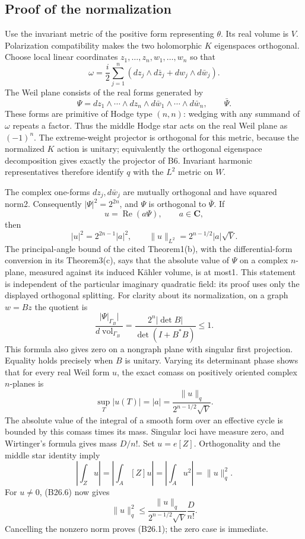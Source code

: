 \subsection{Proof of the normalization}\label{proof-of-the-normalization}

Use the invariant metric of the positive form representing \(\theta\). Its real volume is \(V\). Polarization compatibility makes the two holomorphic \(K\) eigenspaces orthogonal. Choose local linear coordinates \(z_1,\ldots,z_n,w_1,\ldots,w_n\) so that \[
 \omega=\frac i2\sum_{j=1}^n
 (dz_j\wedge d\bar z_j+dw_j\wedge d\bar w_j).
\] The Weil plane consists of the real forms generated by \[
 \Psi=dz_1\wedge\cdots\wedge dz_n
       \wedge d\bar w_1\wedge\cdots\wedge d\bar w_n,
 \qquad \bar\Psi.
\] These forms are primitive of Hodge type \((n,n)\): wedging with any summand of \(\omega\) repeats a factor. Thus the middle Hodge star acts on the real Weil plane as \((-1)^n\). The extreme-weight projector is orthogonal for this metric, because the normalized \(K\) action is unitary; equivalently the orthogonal eigenspace decomposition gives exactly the projector of B6. Invariant harmonic representatives therefore identify \(q\) with the \(L^2\) metric on \(W\).

The complex one-forms \(dz_j,d\bar w_j\) are mutually orthogonal and have squared norm2. Consequently \(|\Psi|^2=2^{2n}\), and \(\Psi\) is orthogonal to \(\bar\Psi\). If \[
 u=\operatorname{Re}(a\Psi),\qquad a\in\mathbf C,
\] then \[
 |u|^2=2^{2n-1}|a|^2,
 \qquad \|u\|_{L^2}=2^{n-1/2}|a|\sqrt V.
 \tag{B26.4}
\] The principal-angle bound of the cited Theorem1(b), with the differential-form conversion in its Theorem3(c), says that the absolute value of \(\Psi\) on a complex \(n\)-plane, measured against its induced Kähler volume, is at most1. This statement is independent of the particular imaginary quadratic field: its proof uses only the displayed orthogonal splitting. For clarity about its normalization, on a graph \(w=Bz\) the quotient is \[
 \frac{|\Psi|_{\Gamma_B}|}{d\operatorname{vol}_{\Gamma_B}}
 =\frac{2^n|\det B|}{\det(I+B^*B)}\le1.
 \tag{B26.5}
\] This formula also gives zero on a nongraph plane with singular first projection. Equality holds precisely when \(B\) is unitary. Varying its determinant phase shows that for every real Weil form \(u\), the exact comass on positively oriented complex \(n\)-planes is \[
 \sup_T|u(T)|=|a|=
 \frac{\|u\|_q}{2^{n-1/2}\sqrt V}.
 \tag{B26.6}
\] The absolute value of the integral of a smooth form over an effective cycle is bounded by this comass times its mass. Singular loci have measure zero, and Wirtinger's formula gives mass \(D/n!\). Set \(u=e[Z]\). Orthogonality and the middle star identity imply \[
 \left|\int_Zu\right|
 =\left|\int_A[Z]u\right|
 =\left|\int_Au^2\right|=\|u\|_q^2.
\] For \(u\ne0\), (B26.6) now gives \[
 \|u\|_q^2\le
 \frac{\|u\|_q}{2^{n-1/2}\sqrt V}\frac D{n!}.
\] Cancelling the nonzero norm proves (B26.1); the zero case is immediate.

